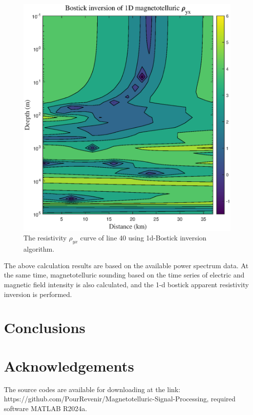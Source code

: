 \documentclass[9pt,a4paper,twoside]{rho-class/rho}
\begin{document}
\begin{figure}[H]
    \centering
    \includegraphics[width=0.95\columnwidth]{figures/Bostick1dryx.eps}
    \caption{The resistivity $\rho_{yx}$ curve of line 40 using 1d-Bostick inversion algorithm.}
    \label{fig:bostick2}
\end{figure}

The above calculation results are based on the available power spectrum data. At the same time, magnetotelluric sounding based on the time series of electric and magnetic field intensity is also calculated, and the 1-d bostick apparent resistivity inversion is performed.


\section{Conclusions}

\section{Acknowledgements}

\begin{rhoenv}[frametitle=Code availability]
    The source codes are available for downloading at the link: https://github.com/PourRevenir/Magnetotelluric-Signal-Processing, required software MATLAB R2024a.
\end{rhoenv}
\end{document}

